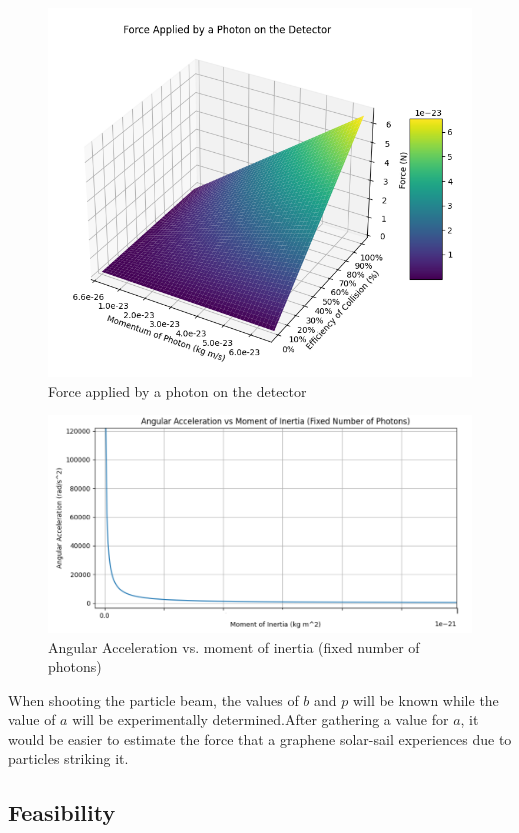 \documentclass{article}
\begin{document}
\begin{figure}[H]
\includegraphics[scale=0.4]{force.png}
\caption{Force applied by a photon on the detector}
\end{figure}

\begin{figure}[H]
\includegraphics[scale=0.3]{acceleration.png}
\caption{Angular Acceleration vs. moment of inertia (fixed number of photons)}
\end{figure}

When shooting the particle beam, the values of $b$ and $p$ will be known while the value of $a$ will be experimentally determined.After gathering a value for $a$, it would be easier to estimate the force that a graphene solar-sail experiences due to particles striking it.

\subsection{Feasibility}
\end{document}
